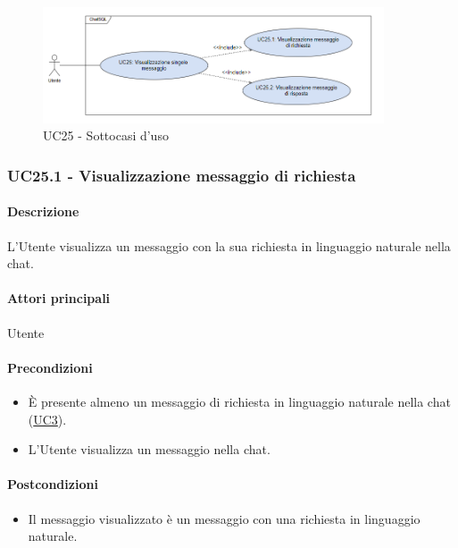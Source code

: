 \begin{figure}[H]
  \centering
  \includegraphics[width=0.90\textwidth]{assets/uc25.png}
  \caption{UC25 - Sottocasi d'uso}
\end{figure}


\subsubsection{UC25.1 - Visualizzazione messaggio di richiesta}\label{UC25point1}
\paragraph*{Descrizione}
L'Utente visualizza un messaggio con la sua richiesta in linguaggio naturale nella chat.

\paragraph*{Attori principali}
Utente

\paragraph*{Precondizioni}
\begin{itemize}
  \item È presente almeno un messaggio di richiesta in linguaggio naturale nella chat (\hyperref[UC3]{UC3}).
  \item L'Utente visualizza un messaggio nella chat.
\end{itemize}

\paragraph*{Postcondizioni}
\begin{itemize}
  \item Il messaggio visualizzato è un messaggio con una richiesta in linguaggio naturale.
\end{itemize}

